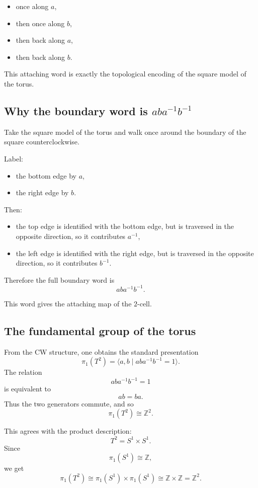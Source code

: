 \documentclass[12pt,a4paper]{article}
\theoremstyle{notespace}
\begin{document}
\begin{itemize}
	\item once along \(a\),
	\item then once along \(b\),
	\item then back along \(a\),
	\item then back along \(b\).
\end{itemize}

This attaching word is exactly the topological encoding of the square model of the torus.

\subsection{Why the boundary word is \(aba^{-1}b^{-1}\)}

Take the square model of the torus and walk once around the boundary of the square counterclockwise.

Label:

\begin{itemize}
	\item the bottom edge by \(a\),
	\item the right edge by \(b\).
\end{itemize}

Then:

\begin{itemize}
	\item the top edge is identified with the bottom edge, but is traversed in the opposite direction, so it contributes \(a^{-1}\),
	\item the left edge is identified with the right edge, but is traversed in the opposite direction, so it contributes \(b^{-1}\).
\end{itemize}

Therefore the full boundary word is
\[
aba^{-1}b^{-1}.
\]

This word gives the attaching map of the \(2\)-cell.

\subsection{The fundamental group of the torus}

From the CW structure, one obtains the standard presentation
\[
\pi_1(T^2)=\langle a,b\mid aba^{-1}b^{-1}=1\rangle.
\]
The relation
\[
aba^{-1}b^{-1}=1
\]
is equivalent to
\[
ab=ba.
\]
Thus the two generators commute, and so
\[
\pi_1(T^2)\cong \mathbb Z^2.
\]

This agrees with the product description:
\[
T^2=S^1\times S^1.
\]
Since
\[
\pi_1(S^1)\cong \mathbb Z,
\]
we get
\[
\pi_1(T^2)\cong \pi_1(S^1)\times \pi_1(S^1)\cong \mathbb Z\times \mathbb Z=\mathbb Z^2.
\]
\end{document}
